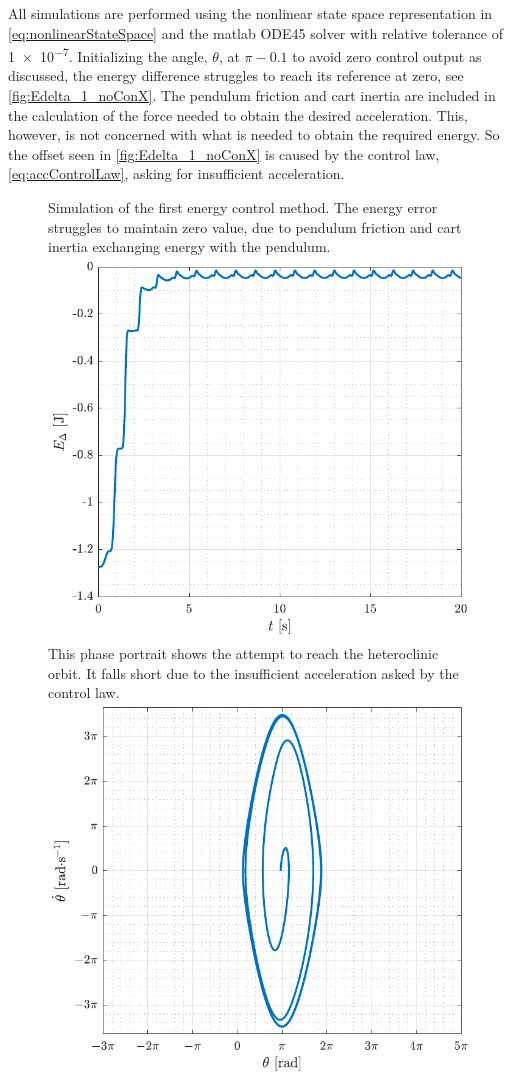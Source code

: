 All simulations are performed using the nonlinear state space representation in \autoref{eq:nonlinearStateSpace} and the matlab ODE45 solver with relative tolerance of \SI{1e-7}{}. Initializing the angle, $\theta$, at $\pi-0.1$ to avoid zero control output as discussed, the energy difference struggles to reach its reference at zero, see \autoref{fig:Edelta_1_noConX}. The pendulum friction and cart inertia are included in the calculation of the force needed to obtain the desired acceleration. This, however, is not concerned with what is needed to obtain the required energy. So the offset seen in \autoref{fig:Edelta_1_noConX} is caused by the control law, \autoref{eq:accControlLaw}, asking for insufficient acceleration.
%
\begin{figure}[H]
  \hspace{-10pt}
  \captionbox
  {
    Simulation of the first energy control method. The energy error struggles to maintain zero value, due to pendulum friction and cart inertia exchanging energy with the pendulum.
    \label{fig:Edelta_1_noConX}
  }
  {
    \hspace{-1cm}
    \includegraphics[width=.455\textwidth]{figures/Edelta_1_noConX}
  }
  \hspace{20pt}
  \captionbox 
  {
    This phase portrait shows the attempt to reach the heteroclinic orbit. It falls short due to the insufficient acceleration asked by the control law.
    \label{fig:phase_1_noConX}
  }
  {
    \hspace{-1cm}
    \includegraphics[width=.46\textwidth]{figures/phase_1_noConX}
  }  
\end{figure}
